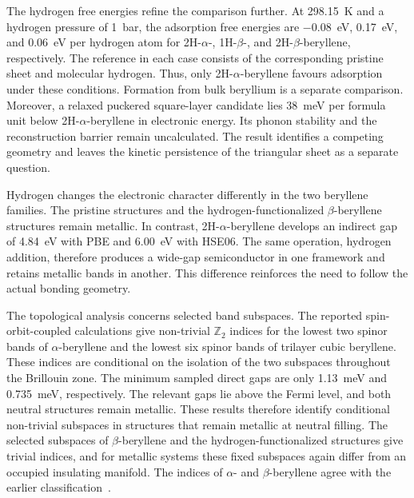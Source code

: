 The hydrogen free energies refine the comparison further.
At \qty{298.15}{\kelvin} and a hydrogen pressure of \qty{1}{\bar},
the adsorption free energies are \qty{-0.08}{\electronvolt},
\qty[retain-explicit-plus]{+0.17}{\electronvolt}, and \qty[retain-explicit-plus]{+0.06}{\electronvolt} per hydrogen atom for 2H-$\alpha$-, 1H-$\beta$-, and 2H-$\beta$-beryllene, respectively.
The reference in each case consists of the corresponding pristine sheet and molecular hydrogen.
Thus, only 2H-$\alpha$-beryllene favours adsorption under these conditions.
Formation from bulk beryllium is a separate comparison.
Moreover, a relaxed puckered square-layer  candidate lies \qty{38}{\milli\electronvolt} per formula unit below 2H-$\alpha$-beryllene in electronic energy.
Its phonon stability and the reconstruction barrier remain uncalculated.
The result identifies a competing geometry and leaves the kinetic persistence of the triangular sheet as a separate question.

Hydrogen changes the electronic character differently in the two beryllene families.
The pristine structures and the hydrogen-functionalized $\beta$-beryllene structures remain metallic.
In contrast, 2H-$\alpha$-beryllene develops an indirect gap of \qty{4.84}{\electronvolt} with PBE and \qty{6.00}{\electronvolt} with HSE06.
The same operation, hydrogen addition, therefore produces a wide-gap semiconductor in one framework and retains metallic bands in another.
This difference reinforces the need to follow the actual bonding geometry.

The topological analysis concerns selected band subspaces.
The reported spin-orbit-coupled calculations give non-trivial $\mathbb{Z}_2$ indices for the lowest two spinor bands of $\alpha$-beryllene and the lowest six spinor bands of trilayer cubic beryllene.
These indices are conditional on the isolation of the two subspaces throughout the Brillouin zone.
The minimum sampled direct gaps are only \qty{1.13}{\milli\electronvolt} and \qty{0.735}{\milli\electronvolt}, respectively.
The relevant gaps lie above the Fermi level, and both neutral structures remain metallic.
These results therefore identify conditional non-trivial subspaces in structures that remain metallic at neutral filling.
The selected subspaces of $\beta$-beryllene and the hydrogen-functionalized structures give trivial indices, and for metallic systems these fixed subspaces again differ from an occupied insulating manifold.
The indices of $\alpha$- and $\beta$-beryllene agree with the earlier classification~\cite{li2023coexistence}.

